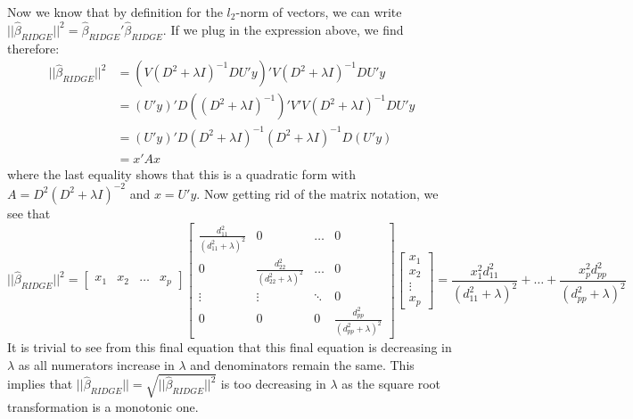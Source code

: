 \documentclass[a4paper,titlepage,onecolumn,table]{article}
\begin{document}
	Now we know that by definition for the $l_2$-norm of vectors, we can write $||\hat{\beta}_{RIDGE}||^2 = \hat{\beta}_{RIDGE}'\hat{\beta}_{RIDGE}$. If we plug in the expression above, we find therefore:
	\begin{align*}
	||\hat{\beta}_{RIDGE}||^2 &=  (V(D^2+\lambda I)^{-1}DU'y)'V(D^2+\lambda I)^{-1}DU'y \\
	& = (U'y)'D((D^2+\lambda I)^{-1})'V'V(D^2 + \lambda I)^{-1}DU'y \\
	& = (U'y)'D(D^2+\lambda I)^{-1}(D^2 + \lambda I)^{-1}D(U'y) \\
	& = x'Ax
	\end{align*}
	where the last equality shows that this is a quadratic form with $A = D^2(D^2+\lambda I)^{-2}$ and $x = U'y$. Now getting rid of the matrix notation, we see that 
	\begin{equation*}
	||\hat{\beta}_{RIDGE}||^2 = 
	\begin{bmatrix}
	x_1 & x_2 & \hdots & x_p 
	\end{bmatrix}
	\begin{bmatrix}
	\frac{d_{11}^2}{(d_{11}^2+\lambda)^2}       & 0  & \dots & 0 \\
	0       & \frac{d_{22}^2}{(d_{22}^2+\lambda)^2}  & \dots & 0 \\
	\vdots  & \vdots & \ddots & 0 \\
	0 & 0 & 0 & \frac{d_{pp}^2}{(d_{pp}^2+\lambda)^2}
	\end{bmatrix}
	\begin{bmatrix}
	x_1 \\ x_2 \\ \vdots \\ x_p 
	\end{bmatrix}
	= \frac{x_1^2d_{11}^2}{(d_{11}^2+\lambda)^2} + \hdots + \frac{x_p^2d_{pp}^2}{(d_{pp}^2+\lambda)^2}
	\end{equation*}
	It is trivial to see from this final equation that this final equation is decreasing in $\lambda$ as all numerators increase in $\lambda$ and denominators remain the same. This implies that  $||\hat{\beta}_{RIDGE}|| = \sqrt{||\hat{\beta}_{RIDGE}||^2}$ is too decreasing in $\lambda$ as the square root transformation is a monotonic one.
	

	\hspace{-.1\linewidth}
	
	
	
	
\end{document}
